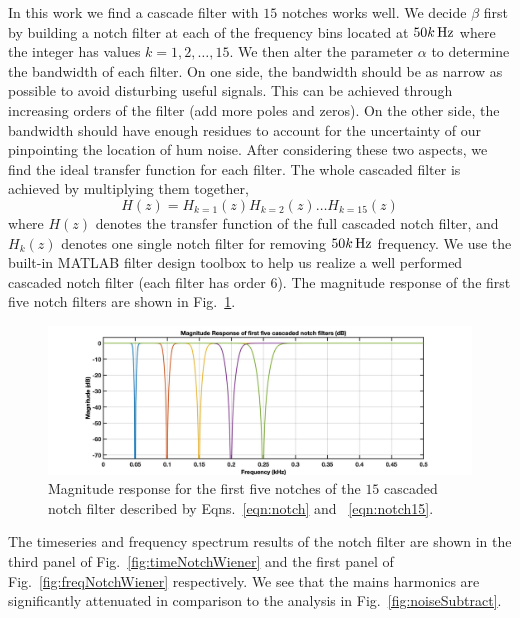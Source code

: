 \documentclass[paper-main.tex]{subfiles}
\begin{document}
In this work we find a cascade filter with $15$ notches works well. 
We decide $\beta$ first by building a notch filter at each of the frequency bins located at $50k\,{\rm Hz}$ where the integer has values $k=1,2,\dots,15$. 
We then alter the parameter $\alpha$ to determine the bandwidth of each filter. 
On one side, the bandwidth should be as narrow as possible to avoid disturbing useful signals. 
This can be achieved through increasing orders of the filter (add more poles and zeros). 
On the other side, the bandwidth should have enough residues to account for the uncertainty of our pinpointing the location of hum noise. 
After considering these two aspects, we find the ideal transfer function for each filter. 
The whole cascaded filter is achieved by multiplying them together, 
\begin{equation}
    \label{eqn:notch15}
    H(z) = H_{k=1}(z) H_{k=2}(z)\dots H_{k=15}(z)
\end{equation}
where $H(z)$ denotes the transfer function of the full cascaded notch filter, and $H_k(z)$ denotes one single notch filter for removing $50k \, {\rm Hz}$ frequency. 
We use the built-in MATLAB filter design toolbox to help us realize a well performed cascaded notch filter (each filter has order 6).  
The magnitude response of the first five notch filters are shown in Fig.~\ref{fig:notchMagResponse}. 
\begin{figure}
\begin{center}
\includegraphics[width=.7\textwidth]{figures/1111}
\end{center}
\caption{\label{fig:notchMagResponse}
Magnitude response for the first five notches of the $15$ cascaded notch filter described by Eqns.~\ref{eqn:notch} and ~\ref{eqn:notch15}. 
}
\end{figure}


The timeseries and frequency spectrum results of the notch filter are shown in the third panel of Fig.~\ref{fig:timeNotchWiener} and the first panel of Fig.~\ref{fig:freqNotchWiener} respectively. 
We see that the mains harmonics are significantly attenuated in comparison to the analysis in Fig.~\ref{fig:noiseSubtract}. 
\end{document}
